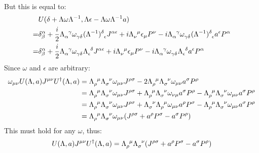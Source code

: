 \documentclass[12pt,a4]{article}
\begin{document}
\begin{enumerate}
\begin{enumerate}
\begin{align*}
    \end{align*}
    But this is equal to:
    \begin{align*}
        & U(\delta +\Lambda \omega \Lambda^{-1},\Lambda \epsilon - \Lambda \omega \Lambda^{-1}a)\\
      = & \delta^\alpha_\beta + \frac{i}{2} \tensor{\Lambda}{_\alpha^\gamma} \tensor{\omega}{_\gamma_\delta}\tensor{(\Lambda^{-1})}{^\delta_\epsilon} J^{\alpha\epsilon} + i\tensor{\Lambda}{_\nu^\mu} \epsilon_\mu P^\nu - i\tensor{\Lambda}{_\alpha^\gamma}\tensor{\omega}{_\gamma_\delta}\tensor{(\Lambda^{-1})}{^\delta_\epsilon} a^\epsilon P^\alpha\\
      = & \delta^\alpha_\beta + \frac{i}{2} \tensor{\Lambda}{_\alpha^\gamma} \tensor{\omega}{_\gamma_\delta}\tensor{\Lambda}{_\epsilon^\delta} J^{\alpha\epsilon} + i\tensor{\Lambda}{_\nu^\mu} \epsilon_\mu P^\nu - i\tensor{\Lambda}{_\alpha^\gamma}\tensor{\omega}{_\gamma_\delta}\tensor{\Lambda}{_\epsilon^\delta} a^\epsilon P^\alpha
    \end{align*}
    Since $\omega$ and $\epsilon$ are arbitrary:
    \begin{align*}
      \omega_{\mu\nu}U(\Lambda, a) J^{\mu\nu} U^{\dagger}(\Lambda, a) &= \tensor{\Lambda}{_\rho^\mu} \tensor{\Lambda}{_\sigma^\nu} \omega_{\mu\nu}J^{\rho\sigma} - 2\tensor{\Lambda}{_\rho^\mu}\tensor{\Lambda}{_\sigma^\nu} \omega_{\mu\nu} a^\sigma P^\rho\\
                                                                      &= \tensor{\Lambda}{_\rho^\mu} \tensor{\Lambda}{_\sigma^\nu} \omega_{\mu\nu}J^{\rho\sigma} + \tensor{\Lambda}{_\rho^\mu}\tensor{\Lambda}{_\sigma^\nu} \omega_{\nu\mu} a^\sigma P^\rho - \tensor{\Lambda}{_\rho^\mu}\tensor{\Lambda}{_\sigma^\nu} \omega_{\mu\nu} a^\sigma P^\rho\\
                                                                      &= \tensor{\Lambda}{_\rho^\mu} \tensor{\Lambda}{_\sigma^\nu} \omega_{\mu\nu}J^{\rho\sigma} + \tensor{\Lambda}{_\sigma^\nu}\tensor{\Lambda}{_\rho^\mu} \omega_{\mu\nu} a^\rho P^\sigma - \tensor{\Lambda}{_\rho^\mu}\tensor{\Lambda}{_\sigma^\nu} \omega_{\mu\nu} a^\sigma P^\rho\\
                                                                      &= \tensor{\Lambda}{_\rho^\mu} \tensor{\Lambda}{_\sigma^\nu} \omega_{\mu\nu}(J^{\rho\sigma} + a^\rho P^\sigma - a^\sigma P^\rho)
    \end{align*}
    This must hold for any $\omega$, thus:
    \begin{align*}
      U(\Lambda, a) J^{\mu\nu} U^{\dagger}(\Lambda, a) &= \tensor{\Lambda}{_\rho^\mu} \tensor{\Lambda}{_\sigma^\nu} (J^{\rho\sigma} + a^\rho P^\sigma - a^\sigma P^\rho)\\

\end{align*}
\end{enumerate}
\end{enumerate}
\end{document}
